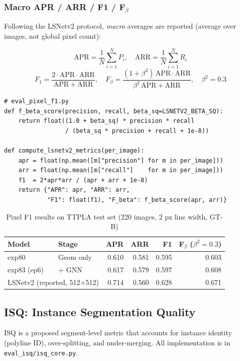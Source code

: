 \documentclass[11pt,a4paper]{article}
\begin{document}
\subsubsection{Macro APR / ARR / F1 / F$_\beta$}

Following the LSNetv2 protocol, \emph{macro} averages are reported
(average over images, not global pixel count):

\[
\mathrm{APR} = \frac{1}{N}\sum_{i=1}^N P_i,\quad
\mathrm{ARR} = \frac{1}{N}\sum_{i=1}^N R_i
\]
\[
F_1 = \frac{2 \cdot \mathrm{APR} \cdot \mathrm{ARR}}
           {\mathrm{APR} + \mathrm{ARR}},\quad
F_\beta = \frac{(1+\beta^2)\,\mathrm{APR}\cdot\mathrm{ARR}}
               {\beta^2\,\mathrm{APR} + \mathrm{ARR}}, \quad \beta^2 = 0.3
\]

\begin{lstlisting}
# eval_pixel_f1.py
def f_beta_score(precision, recall, beta_sq=LSNETV2_BETA_SQ):
    return float((1.0 + beta_sq) * precision * recall
                 / (beta_sq * precision + recall + 1e-8))

def compute_lsnetv2_metrics(per_image):
    apr = float(np.mean([m["precision"] for m in per_image]))
    arr = float(np.mean([m["recall"]    for m in per_image]))
    f1  = 2*apr*arr / (apr + arr + 1e-8)
    return {"APR": apr, "ARR": arr,
            "F1": float(f1), "F_beta": f_beta_score(apr, arr)}
\end{lstlisting}

\begin{table}[H]
\centering
\caption{Pixel F1 results on TTPLA test set (220 images, 2 px line width, GT-B)}
\begin{tabular}{llrrrr}
\toprule
Model & Stage & APR & ARR & F1 & F$_\beta$ ($\beta^2{=}0.3$) \\
\midrule
exp80 & Geom only & 0.610 & 0.581 & 0.595 & 0.603 \\
exp83 (ep6) & + GNN & 0.617 & 0.579 & 0.597 & 0.608 \\
\midrule
\multicolumn{2}{l}{LSNetv2 (reported, 512$\times$512)} & 0.714 & 0.560 & 0.628 & 0.671 \\
\bottomrule
\end{tabular}
\end{table}

\subsection{ISQ: Instance Segmentation Quality}
\label{subsec:isq}

ISQ is a proposed segment-level metric that accounts for instance identity
(polyline ID), over-splitting, and under-merging.
All implementation is in \texttt{eval\_isq/isq\_core.py}.
\end{document}
